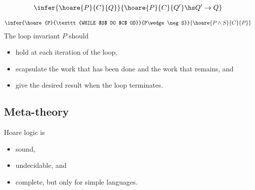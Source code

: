 \documentclass{article}
\begin{document}
\begin{definition}
	\begin{align*}
		\infer{\hoare{P}{C}{Q}}{\hoare{P}{C}{Q'}\hs Q'\to Q}
	\end{align*}
\end{definition}

\begin{definition}
	\begin{align*}
		\infer{\hoare{P}{\texttt{WHILE $S$ DO $C$ OD}}{P\wedge\neg S}}{\hoare{P\wedge S}{C}{P}}
	\end{align*}
	The loop invariant $P$ should
	\begin{itemize}
		\item hold at each iteration of the loop,
		\item ecapsulate the work that has been done and the work that remains, and
		\item give the desired result when the loop terminates.
	\end{itemize}
\end{definition}

\subsection{Meta-theory}

\begin{theorem}
	Hoare logic is
	\begin{itemize}
		\item sound,
		\item undecidable, and
		\item complete, but only for simple languages.
	\end{itemize}
\end{theorem}
\end{document}
